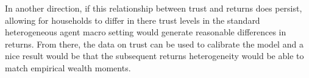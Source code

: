 \documentclass{scrartcl}
\begin{document}
In another direction, if this relationship between trust and returns does persist, allowing for households to differ in there trust levels in the standard heterogeneous agent macro setting would generate reasonable differences in returns. From there, the data on trust can be used to calibrate the model and a nice result would be that the subsequent returns heterogeneity would be able to match empirical wealth moments.
\end{document}
